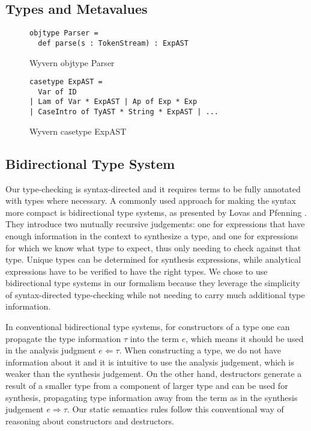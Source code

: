 \subsection{Types and Metavalues}



\begin{figure}
\begin{lstlisting}
objtype Parser = 
  def parse(s : TokenStream) : ExpAST
\end{lstlisting}
\caption{Wyvern objtype Parser}
\label{fig:typeParser}
\end{figure}

\begin{figure}
\begin{lstlisting}
casetype ExpAST = 
  Var of ID 
| Lam of Var * ExpAST | Ap of Exp * Exp 
| CaseIntro of TyAST * String * ExpAST | ...
\end{lstlisting}
\caption{Wyvern casetype ExpAST}
\label{fig:wyvExpAST}
\end{figure}

\subsection{Bidirectional Type System}
Our type-checking is syntax-directed and it requires terms to be fully annotated with types where necessary. A commonly used approach for making the syntax more compact is bidirectional type systems, as presented by Lovas and Pfenning \cite{Lovas08abidirectional}. They introduce two mutually recursive judgements: one for expressions that have enough information in the context to synthesize a type, and one for expressions for which we know what type to expect, thus only needing to check against that type. Unique types can be determined for synthesis expressions, while analytical expressions have to be verified to have the right types. We chose to use bidirectional type systems in our formalism because they leverage the simplicity of syntax-directed type-checking while not needing to carry much additional type information.

In conventional bidirectional type systems, for constructors of a type one can propagate the type information $\tau$
into the term $e$, which means it should be used in the analysis
judgment $e \Leftarrow \tau$. When constructing a type, we do not have information about it and it is intuitive to use the analysis judgement, which is weaker than the synthesis judgement. On the other hand, destructors generate a result of a smaller type from a component of larger type and can be used for synthesis, propagating type information away from the term as in the synthesis judgement $e \Rightarrow \tau$. Our static semantics rules follow this conventional way of reasoning about constructors and destructors.

